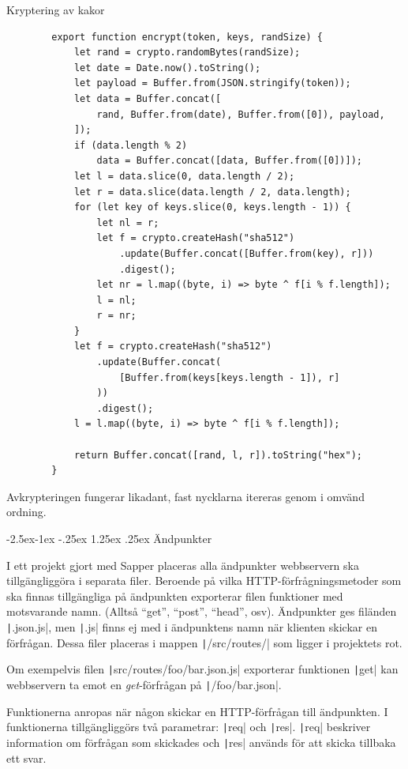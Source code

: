 \documentclass{article}
\makeatletter
\renewcommand*\paragraph{\@startsection{paragraph}{4}{\z@}%
			{-2.5ex\@plus -1ex \@minus -.25ex}%
			{1.25ex \@plus .25ex}%
			{\normalfont\normalsize\bfseries}}
\makeatother
\begin{document}
\begin{listing}[H]
	\caption{Kryptering av kakor}
	\begin{verbatim}
		export function encrypt(token, keys, randSize) {
			let rand = crypto.randomBytes(randSize);
			let date = Date.now().toString();
			let payload = Buffer.from(JSON.stringify(token));
			let data = Buffer.concat([
				rand, Buffer.from(date), Buffer.from([0]), payload,
			]);
			if (data.length % 2)
				data = Buffer.concat([data, Buffer.from([0])]);
			let l = data.slice(0, data.length / 2);
			let r = data.slice(data.length / 2, data.length);
			for (let key of keys.slice(0, keys.length - 1)) {
				let nl = r;
				let f = crypto.createHash("sha512")
					.update(Buffer.concat([Buffer.from(key), r]))
					.digest();
				let nr = l.map((byte, i) => byte ^ f[i % f.length]);
				l = nl;
				r = nr;
			}
			let f = crypto.createHash("sha512")
				.update(Buffer.concat(
					[Buffer.from(keys[keys.length - 1]), r]
				))
				.digest();
			l = l.map((byte, i) => byte ^ f[i % f.length]);

			return Buffer.concat([rand, l, r]).toString("hex");
		}
	\end{verbatim}
\end{listing}

Avkrypteringen fungerar likadant, fast nycklarna itereras genom i omvänd
ordning.

\paragraph{Ändpunkter}

I ett projekt gjort med Sapper placeras alla ändpunkter webbservern ska
tillgängliggöra i separata filer. Beroende på vilka HTTP-förfrågningsmetoder som
ska finnas tillgängliga på ändpunkten exporterar filen funktioner med
motsvarande namn. (Alltså ``get'', ``post'', ``head'', osv). Ändpunkter ges
filänden \texttt|.json.js|, men
\texttt|.js| finns ej med i ändpunktens namn när
klienten skickar en förfrågan. Dessa filer placeras i mappen
\texttt|/src/routes/| som ligger i projektets rot.

Om exempelvis filen \texttt|src/routes/foo/bar.json.js|
exporterar funktionen \texttt|get| kan webbservern ta
emot en \textit{get}-förfrågan på
\texttt|/foo/bar.json|.

Funktionerna anropas när någon skickar en HTTP-förfrågan till ändpunkten. I
funktionerna tillgängliggörs två parametrar:
\texttt|req| och \texttt|res|.
\texttt|req| beskriver information om förfrågan som
skickades och \texttt|res| används för att skicka
tillbaka ett svar.
\end{document}

